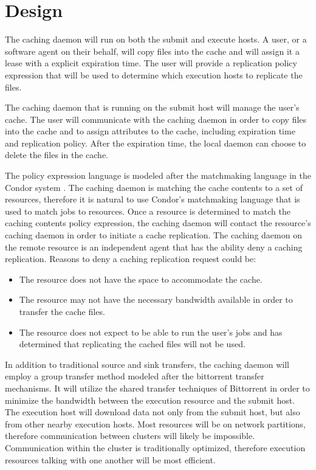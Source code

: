 \section{Design}

The caching daemon will run on both the submit and execute hosts.  A user, or a software agent on their behalf, will copy files into the cache and will assign it a lease with a explicit expiration time.  The user will provide a replication policy expression that will be used to determine which execution hosts to replicate the files.

The caching daemon that is running on the submit host will manage the user's cache.  The user will communicate with the caching daemon in order to copy files into the cache and to assign attributes to the cache, including expiration time and replication policy.  After the expiration time, the local daemon can choose to delete the files in the cache.

The policy expression language is modeled after the matchmaking language in the Condor system \cite{raman1998matchmaking}.  The caching daemon is matching the cache contents to a set of resources, therefore it is natural to use Condor's matchmaking language that is used to match jobs to resources.  Once a resource is determined to match the caching contents policy expression, the caching daemon will contact the resource's caching daemon in order to initiate a cache replication.  The caching daemon on the remote resource is an independent agent that has the ability deny a caching replication.  Reasons to deny a caching replication request could be:

\begin{itemize}
\item The resource does not have the space to accommodate the cache.
\item The resource may not have the necessary bandwidth available in order to transfer the cache files.
\item The resource does not expect to be able to run the user's jobs and has determined that replicating the cached files will not be used.
\end{itemize}

In addition to traditional source and sink transfers, the caching daemon will employ a group transfer method modeled after the bittorrent \cite{cohen2008bittorrent} transfer mechanisms.  It will utilize the shared transfer techniques of Bittorrent in order to minimize the bandwidth between the execution resource and the submit host.  The execution host will download data not only from the submit host, but also from other nearby execution hosts.  Most resources will be on network partitions, therefore communication between clusters will likely be impossible.  Communication within the cluster is traditionally optimized, therefore execution resources talking with one another will be most efficient.

